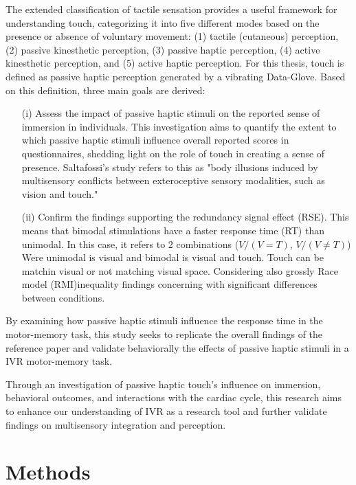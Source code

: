 \documentclass[12pt,oneside,openright]{report}
\begin{document}
The extended classification of tactile sensation \cite{Healy2003HandbookOP} provides a useful framework for understanding touch, categorizing it into five different modes based on the presence or absence of voluntary movement: (1) tactile (cutaneous) perception, (2) passive kinesthetic perception, (3) passive haptic perception, (4) active kinesthetic perception, and (5) active haptic perception. For this thesis, touch is defined as passive haptic perception generated by a vibrating Data-Glove. Based on this definition, three main goals are derived:

\begin{itemize}
  \item[(i)] Assess the impact of passive haptic stimuli on the reported sense of immersion in individuals. This investigation aims to quantify the extent to which passive haptic stimuli influence overall reported scores in questionnaires, shedding light on the role of touch in creating a sense of presence. Saltafossi's study refers to this as "body illusions induced by multisensory conflicts between exteroceptive sensory modalities, such as vision and touch."
    
  \item[(ii)] Confirm the findings supporting the redundancy signal effect (RSE). This means that bimodal stimulations have a faster response time (RT) than unimodal. In this case, it refers to 2 combinations ($V/(V=T)$, $V/(V\neq T)$) Were unimodal is visual and bimodal is visual and touch. Touch can be matchin visual or not matching visual space. Considering also grossly Race model (RMI)inequality findings concerning with significant differences between conditions. 
\end{itemize}

By examining how passive haptic stimuli influence the response time in the motor-memory task, this study seeks to replicate the overall findings of the reference paper \parencite*{SALTAFOSSI2023108642} and validate behaviorally the effects of passive haptic stimuli in a IVR motor-memory task. 

Through an investigation of passive haptic touch's influence on immersion, behavioral outcomes, and interactions with the cardiac cycle, this research aims to enhance our understanding of IVR as a research tool and further validate findings on multisensory integration and perception.


\section*{Methods}
\end{document}
